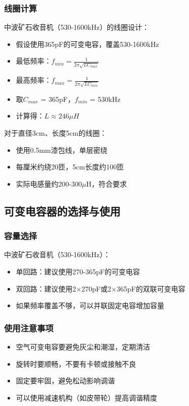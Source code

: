 \documentclass[12pt,UTF8]{ctexbook}
\begin{document}
\subsubsection{线圈计算}

中波矿石收音机（530-1600kHz）的线圈设计：

\begin{itemize}[leftmargin=3.5em]
    \item 假设使用365pF的可变电容，覆盖530-1600kHz
    \item 最低频率：$f_{min} = \frac{1}{2\pi\sqrt{L C_{max}}}$
    \item 最高频率：$f_{max} = \frac{1}{2\pi\sqrt{L C_{min}}}$
    \item 取$C_{max}$ = 365pF，$f_{min}$ = 530kHz
    \item 计算得：$L \approx 246\mu H$
\end{itemize}

对于直径3cm、长度5cm的线圈：
\begin{itemize}[leftmargin=3.5em]
    \item 使用0.5mm漆包线，单层密绕
    \item 每厘米约绕20匝，5cm长度约100匝
    \item 实际电感量约200-300$\mu$H，符合要求
\end{itemize}

\subsection{可变电容器的选择与使用}

\subsubsection{容量选择}

中波矿石收音机（530-1600kHz）：
\begin{itemize}[leftmargin=3.5em]
    \item 单回路：建议使用270-365pF的可变电容
    \item 双回路：建议使用2×270pF或2×365pF的双联可变电容
    \item 如果频率覆盖不够，可以并联固定电容增加容量
\end{itemize}

\subsubsection{使用注意事项}

\begin{itemize}[leftmargin=3.5em]
    \item 空气可变电容要避免灰尘和潮湿，定期清洁
    \item 旋转时要顺畅，不要有卡顿或接触不良
    \item 固定要牢固，避免松动影响调谐
    \item 可以使用减速机构（如皮带轮）提高调谐精度
\end{itemize}
\end{document}
